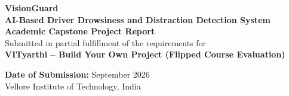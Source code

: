 \documentclass[11pt,a4paper]{article}
\begin{document}
\begin{titlepage}
    \centering
    \vspace*{1.0cm}
    
    {\Huge \textbf{\color{vitblue}VisionGuard}}\\[0.3cm]
    {\LARGE \textbf{AI-Based Driver Drowsiness and Distraction Detection System}}\\[0.8cm]
    
    {\large \textbf{Academic Capstone Project Report}}\\[0.2cm]
    {\normalsize Submitted in partial fulfillment of the requirements for}\\[0.15cm]
    {\normalsize \textbf{VITyarthi -- Build Your Own Project (Flipped Course Evaluation)}}\\[1.2cm]
    
    \begin{center}
    \end{center}
    
    \vfill
    {\normalsize \textbf{Date of Submission:} September 2026}\\[0.2cm]
    {\small Vellore Institute of Technology, India}
\end{titlepage}
\end{document}
